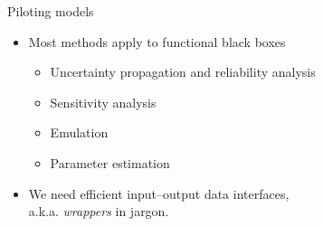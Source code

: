 \documentclass{beamer}
\begin{document}
\begin{frame}{Piloting models}
  \tikzexternaldisable{}
  \begin{itemize}
  \item Most \openturns{} methods apply to functional \alert{black boxes}
    \begin{itemize}
    \item Uncertainty propagation and reliability analysis
    \item Sensitivity analysis
    \item Emulation
    \item Parameter estimation
    \end{itemize}
  \end{itemize}

\vfill
\begin{itemize}
  \item We need efficient \alert{input--output data interfaces},\\a.k.a. \emph{wrappers} in \openturns{} jargon.
\end{itemize}
\end{frame}
\end{document}
